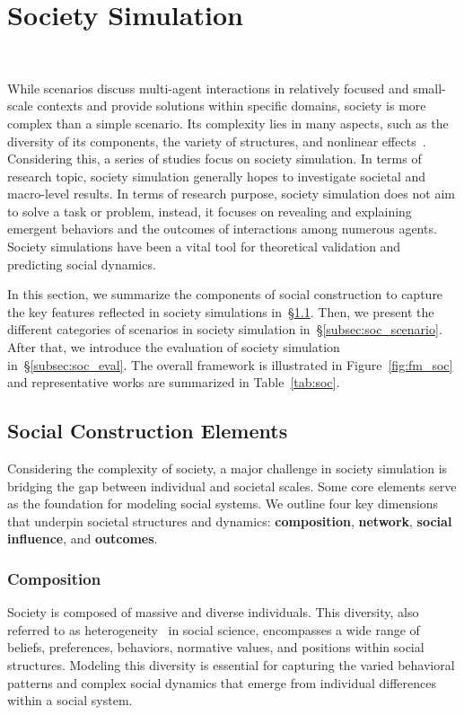 \section{Society Simulation}~\label{sec:soc}




While scenarios discuss multi-agent interactions in relatively focused and small-scale contexts and provide solutions within specific domains, society is more complex than a simple scenario. Its complexity lies in many aspects, such as the diversity of its components, the variety of structures, and nonlinear effects~\cite{squazzoni2014social}. Considering this, a series of studies focus on society simulation. In terms of research topic, society simulation generally hopes to investigate societal and macro-level results. In terms of research purpose, society simulation does not aim to solve a task or problem, instead, it focuses on revealing and explaining emergent behaviors and the outcomes of interactions among numerous agents. Society simulations have been a vital tool for theoretical validation and predicting social dynamics.

In this section, we summarize the components of social construction to capture the key features reflected in society simulations in~\S\ref{subsec:soc_element}. Then, we present the different categories of scenarios in society simulation in~\S\ref{subsec:soc_scenario}. After that, we introduce the evaluation of society simulation in~\S\ref{subsec:soc_eval}. The overall framework is illustrated in Figure~\ref{fig:fm_soc} and representative works are summarized in Table~\ref{tab:soc}.


\subsection{Social Construction Elements}
\label{subsec:soc_element}
Considering the complexity of society, a major challenge in society simulation is bridging the gap between individual and societal scales. Some core elements serve as the foundation for modeling social systems. We outline four key dimensions that underpin societal structures and dynamics: \textbf{composition}, \textbf{network},\textbf{ social influence}, and \textbf{outcomes}.




\subsubsection{Composition}
Society is composed of massive and diverse individuals. This diversity, also referred to as heterogeneity~\cite{squazzoni2014social} in social science, encompasses a wide range of beliefs, preferences, behaviors, normative values, and positions within social structures. Modeling this diversity is essential for capturing the varied behavioral patterns and complex social dynamics that emerge from individual differences within a social system.

